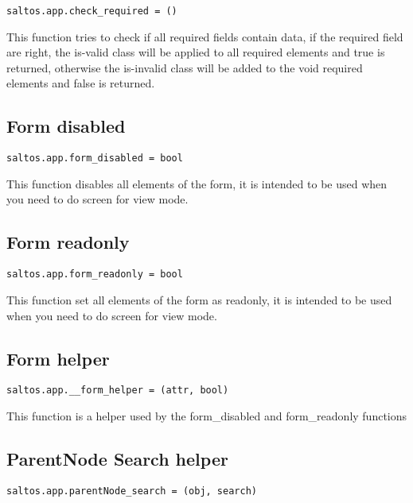 \documentclass[a4paper]{book}
\begin{document}
\begin{lstlisting}
saltos.app.check_required = ()
\end{lstlisting}

This function tries to check if all required fields contain data, if the required field are
right, the is-valid class will be applied to all required elements and true is returned,
otherwise the is-invalid class will be added to the void required elements and false is
returned.

\hypertarget{toc392}{}
\subsection{Form disabled}

\begin{lstlisting}
saltos.app.form_disabled = bool
\end{lstlisting}

This function disables all elements of the form, it is intended to be used when you need
to do screen for view mode.

\hypertarget{toc393}{}
\subsection{Form readonly}

\begin{lstlisting}
saltos.app.form_readonly = bool
\end{lstlisting}

This function set all elements of the form as readonly, it is intended to be used when you need
to do screen for view mode.

\hypertarget{toc394}{}
\subsection{Form helper}

\begin{lstlisting}
saltos.app.__form_helper = (attr, bool)
\end{lstlisting}

This function is a helper used by the form\_disabled and form\_readonly functions

\hypertarget{toc395}{}
\subsection{ParentNode Search helper}

\begin{lstlisting}
saltos.app.parentNode_search = (obj, search)
\end{lstlisting}
\end{document}
